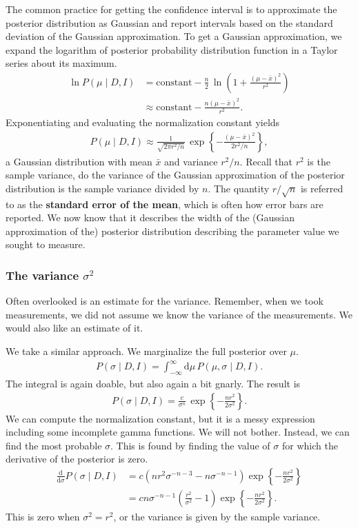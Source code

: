 The common practice for getting the confidence interval is to
approximate the posterior distribution as Gaussian and report
intervals based on the standard deviation of the Gaussian
approximation.  To get a Gaussian approximation, we expand the
logarithm of posterior probability distribution function in a Taylor
series about its maximum.
\begin{align}
\ln P(\mu \mid D, I) &= \text{constant} - \frac{n}{2}\,\ln\left(1 + \frac{(\mu - \bar{x})^2}{r^2}\right) \\
&\approx \text{constant} - \frac{n(\mu - \bar{x})^2}{r^2}.
\end{align}
Exponentiating and evaluating the normalization constant yields
\begin{align}
  P(\mu\mid D, I) \approx \frac{1}{\sqrt{2\pi r^2/n}}\,\exp\left\{
-\frac{(\mu - \bar{x})^2}{2r^2/n}
\right\},
\end{align}
a Gaussian distribution with mean $\bar{x}$ and variance $r^2/n$.
Recall that $r^2$ is the sample variance, do the variance of the
Gaussian approximation of the posterior distribution is the sample
variance divided by $n$.  The quantity $r/\sqrt{n}$ is referred to as
the \textbf{standard error of the mean}, which is often how error bars
are reported.  We now know that it describes the width of the
(Gaussian approximation of the) posterior distribution describing the
parameter value we sought to measure.

\subsubsection{The variance $\sigma^2$}
Often overlooked is an estimate for the variance.  Remember, when we
took measurements, we did not assume we know the variance of the
measurements.  We would also like an estimate of it.

We take a similar approach.  We marginalize the full posterior over
$\mu$.
\begin{align}
P(\sigma\mid D, I) = \int_{-\infty}^\infty \mathrm{d}\mu\,P(\mu,\sigma\mid D, I).
\end{align}
The integral is again doable, but also again a bit gnarly.  The result is
\begin{align}
P(\sigma\mid D, I) = \frac{c}{\sigma^n}\,\exp\left\{-\frac{nr^2}{2\sigma^2}\right\}.
\end{align}
We can compute the normalization constant, but it is a messy
expression including some incomplete gamma functions.  We will not
bother.  Instead, we can find the most probable $\sigma$.  This is
found by finding the value of $\sigma$ for which the derivative of the
posterior is zero.
\begin{align}
  \frac{\mathrm{d}}{\mathrm{d}\sigma}P(\sigma \mid D, I) &=
  c(nr^2\sigma^{-n-3} - n \sigma^{-n-1})\exp\left\{-\frac{nr^2}{2\sigma^2}\right\} \\
  &= c n \sigma^{-n-1}\left(\frac{r^2}{\sigma^2} - 1\right)\exp\left\{-\frac{nr^2}{2\sigma^2}\right\}.
\end{align}
This is zero when $\sigma^2 = r^2$, or the variance is given by the
sample variance.

